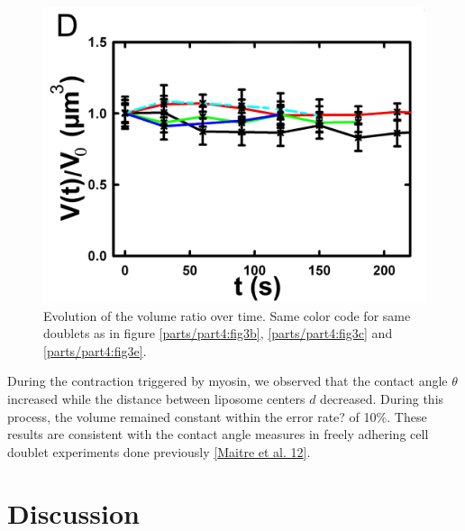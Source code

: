\documentclass[A4paperpaper,11pt,english]{sphinxmanual}
\begin{document}
\begin{figure}[htbp]
\centering
\capstart

\includegraphics[width=0.500\linewidth]{Fig_03-D.png}
\caption{Evolution of the volume ratio over time.
Same color code for same doublets as in figure \hyperref[parts/part4:fig3b]{ \ref*{parts/part4:fig3b}}, \hyperref[parts/part4:fig3c]{ \ref*{parts/part4:fig3c}}
and \hyperref[parts/part4:fig3e]{ \ref*{parts/part4:fig3e}}.}\label{parts/part4:fig3d}\end{figure}

During the contraction triggered by myosin, we observed that the contact angle
\(\theta\) increased while the distance between liposome centers \(d\) decreased.
During this process, the volume remained constant within the error rate? of 10\%.  These
results are consistent with the contact angle measures in freely adhering cell
doublet experiments done previously {\hyperref[parts/part4:maitre2012]{{[}Maitre et al. 12{]}}}.


\section{Discussion}
\label{parts/part4:discussion}
\end{document}
